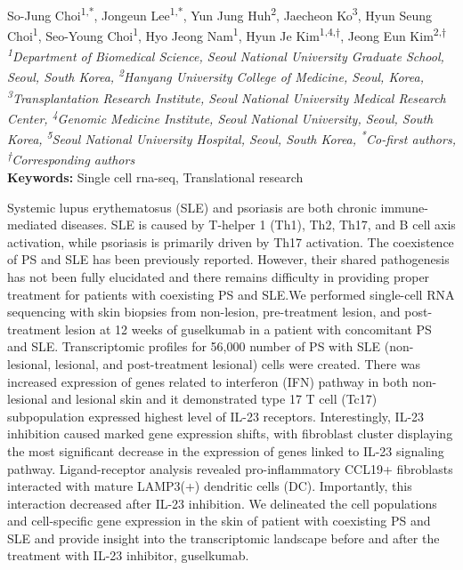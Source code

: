 \begin{center}
So-Jung Choi\href{https://orcid.org/0009-0005-9544-5233}{\textcolor{orcidlogocol}{\aiOrcid}}\textsuperscript{1,*}, Jongeun Lee\textsuperscript{1,*}, Yun Jung Huh\textsuperscript{2}, Jaecheon Ko\textsuperscript{3}, Hyun Seung Choi\textsuperscript{1}, Seo-Young Choi\textsuperscript{1}, Hyo Jeong Nam\textsuperscript{1}, Hyun Je Kim\textsuperscript{1,4,†}, Jeong Eun Kim\textsuperscript{2,†} \\
\vspace{0.2cm}
\textit{\textsuperscript{1}Department of Biomedical Science, Seoul National University Graduate School, Seoul, South Korea, \textsuperscript{2}Hanyang University College of Medicine, Seoul, Korea, \textsuperscript{3}Transplantation Research Institute, Seoul National University Medical Research Center, \textsuperscript{4}Genomic Medicine Institute, Seoul National University, Seoul, South Korea, \textsuperscript{5}Seoul National University Hospital, Seoul, South Korea, \textsuperscript{*}Co-first authors, \textsuperscript{†}Corresponding authors} \\
\vspace{0.2cm}
\textbf{Keywords:} Single cell rna-seq, Translational research
\end{center}

\noindent
Systemic lupus erythematosus (SLE) and psoriasis are both chronic immune-mediated diseases. SLE is caused by T-helper 1 (Th1), Th2, Th17, and B cell axis activation, while psoriasis is primarily driven by Th17 activation. The coexistence of PS and SLE has been previously reported. However, their shared pathogenesis has not been fully elucidated and there remains difficulty in providing proper treatment for patients with coexisting PS and SLE.We performed single-cell RNA sequencing with skin biopsies from non-lesion, pre-treatment lesion, and post-treatment lesion at 12 weeks of guselkumab in a patient with concomitant PS and SLE. Transcriptomic profiles for 56,000 number of PS with SLE (non-lesional, lesional, and post-treatment lesional) cells were created. There was increased expression of genes related to interferon (IFN) pathway in both non-lesional and lesional skin and it demonstrated type 17 T cell (Tc17) subpopulation expressed highest level of IL-23 receptors. Interestingly, IL-23 inhibition caused marked gene expression shifts, with fibroblast cluster displaying the most significant decrease in the expression of genes linked to IL-23 signaling pathway. Ligand-receptor analysis revealed pro-inflammatory CCL19+ fibroblasts interacted with mature LAMP3(+) dendritic cells (DC). Importantly, this interaction decreased after IL-23 inhibition. We delineated the cell populations and cell-specific gene expression in the skin of patient with coexisting PS and SLE and provide insight into the transcriptomic landscape before and after the treatment with IL-23 inhibitor, guselkumab.
\newpage

